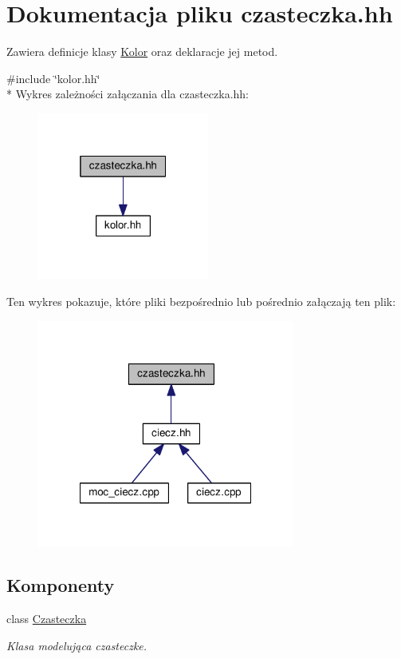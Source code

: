 \hypertarget{czasteczka_8hh}{\section{Dokumentacja pliku czasteczka.\-hh}
\label{czasteczka_8hh}
}


Zawiera definicje klasy \hyperlink{class_kolor}{Kolor} oraz deklaracje jej metod.  


{\ttfamily \#include \char`\"{}kolor.\-hh\char`\"{}}\\*
Wykres zależności załączania dla czasteczka.\-hh\-:\nopagebreak
\begin{figure}[H]
\begin{center}
\leavevmode
\includegraphics[width=160pt]{czasteczka_8hh__incl}
\end{center}
\end{figure}
Ten wykres pokazuje, które pliki bezpośrednio lub pośrednio załączają ten plik\-:\nopagebreak
\begin{figure}[H]
\begin{center}
\leavevmode
\includegraphics[width=239pt]{czasteczka_8hh__dep__incl}
\end{center}
\end{figure}
\subsection*{Komponenty}
\begin{DoxyCompactItemize}
\item 
class \hyperlink{class_czasteczka}{Czasteczka}
\begin{DoxyCompactList}\small\item\em Klasa modelująca czasteczke. \end{DoxyCompactList}\end{DoxyCompactItemize}


